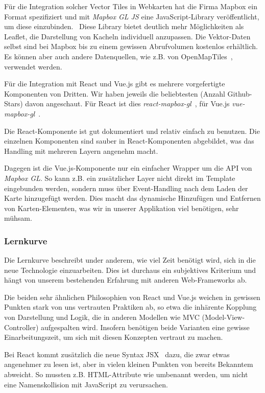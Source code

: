 Für die Integration solcher Vector Tiles in Webkarten hat die Firma Mapbox ein Format spezifiziert und mit \emph{Mapbox GL JS} eine JavaScript-Library veröffentlicht, um diese einzubinden.~\cite{mapbox_gl_js}
Diese Library bietet deutlich mehr Möglichkeiten als Leaflet, die Darstellung von Kacheln individuell anzupassen.
Die Vektor-Daten selbst sind bei Mapbox bis zu einem gewissen Abrufvolumen kostenlos erhältlich.
Es können aber auch andere Datenquellen, wie z.B. von OpenMapTiles~\cite{openmaptiles}, verwendet werden.

Für die Integration mit React und Vue.js gibt es mehrere vorgefertigte Komponenten von Dritten.
Wir haben jeweils die beliebtesten (Anzahl Github-Stars) davon angeschaut.
Für React ist dies \emph{react-mapbox-gl}~\cite{react_mapbox_gl}, für Vue.js \emph{vue-mapbox-gl}~\cite{vue_mapbox_gl}.

Die React-Komponente ist gut dokumentiert und relativ einfach zu benutzen.
Die einzelnen Komponenten sind sauber in React-Komponenten abgebildet, was das Handling mit mehreren Layern angenehm macht.

Dagegen ist die Vue.js-Komponente nur ein einfacher Wrapper um die API von \emph{Mapbox GL}.
So kann z.B. ein zusätzlicher Layer nicht direkt im Template eingebunden werden, sondern muss über Event-Handling nach dem Laden der Karte hinzugefügt werden.
Dies macht das dynamische Hinzufügen und Entfernen von Karten-Elementen, was wir in unserer Applikation viel benötigen, sehr mühsam.

\subsubsection{Lernkurve}
\label{Analyse Framework:Lernkurve}

Die Lernkurve beschreibt under anderem, wie viel Zeit benötigt wird, sich in die neue Technologie einzuarbeiten.
Dies ist durchaus ein subjektives Kriterium und hängt von unserem bestehenden Erfahrung mit anderen Web-Frameworks ab.

Die beiden sehr ähnlichen Philosophien von React und Vue.js weichen in gewissen Punkten stark von uns vertrauten Praktiken ab, so etwa die inhärente Kopplung von Darstellung und Logik, die in anderen Modellen wie MVC (Model-View-Controller) aufgespalten wird.
Insofern benötigen beide Varianten eine gewisse Einarbeitungszeit, um sich mit diesen Konzepten vertraut zu machen.

Bei React kommt zusätzlich die neue Syntax JSX~\cite{jsx} dazu, die zwar etwas angenehmer zu lesen ist, aber in vielen kleinen Punkten von bereits Bekanntem abweicht.
So mussten z.B. HTML-Attribute wie  umbenannt werden, um nicht eine Namenskollision mit JavaScript zu verursachen.

